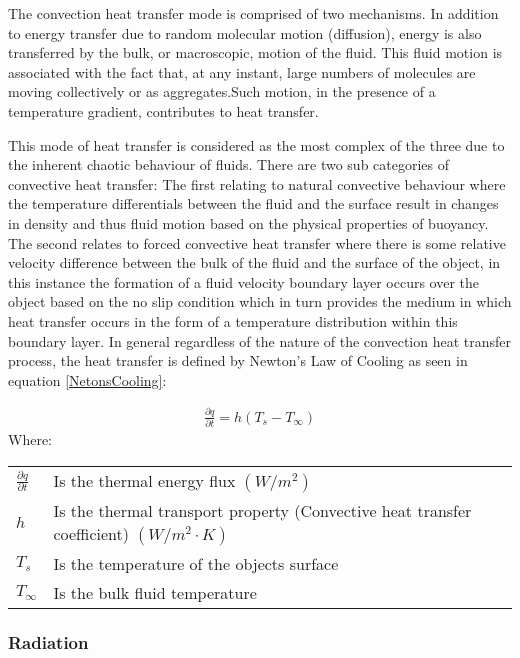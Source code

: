 \documentclass[12pt]{article}
\newcommand{\ts}{\textsuperscript}
\newcommand{\pe}{\vspace{0.3cm}}
\newcommand{\mycite}[1]{\ts{\cite{#1}}}
\begin{document}
\pe 


The convection heat transfer mode is comprised of two mechanisms. In addition to energy
transfer due to random molecular motion (diffusion), energy is also transferred by the bulk, or macroscopic, motion of the fluid. This fluid motion is associated with the fact that, at any instant, large numbers of molecules are moving collectively or as aggregates.Such motion, in the presence of a temperature gradient, contributes to heat transfer\mycite{bergman2011fundamentals}.  
\pe  

This mode of heat transfer is considered as the most complex of the three due to the inherent chaotic behaviour of fluids. There are two sub categories of convective heat transfer: The first relating to natural convective behaviour where the temperature differentials between the fluid and the surface result in changes in density and thus fluid motion based on the physical properties of buoyancy. The second relates to forced convective heat transfer where there is some relative velocity difference between the bulk of the fluid and the surface of the object, in this instance the formation of a fluid velocity boundary layer occurs over the object based on the no slip condition which in turn provides the medium in which heat transfer occurs in the form of a temperature distribution within this boundary layer. In general regardless of the nature of the convection heat transfer process, the heat transfer is defined by Newton's Law of Cooling as seen in equation \ref{NetonsCooling}: 

\begin{align} \label{NetonsCooling}
	\frac{\partial q}{\partial t} = h(T_s - T_\infty) 
\end{align}
Where: \\ 
\begin{tabular}{l | l}
	$\frac{\partial q}{\partial t}$ & Is the thermal energy flux $(W/m^2)$ \\ 
	$h$ & Is the thermal transport property (Convective heat transfer coefficient) $(W/m^2 \cdot K)$ \\ 
	$T_s$ & Is the temperature of the objects surface \\ 
	$T_\infty$ & Is the bulk fluid temperature \\   
\end{tabular}


\subsubsection{Radiation}
\end{document}
